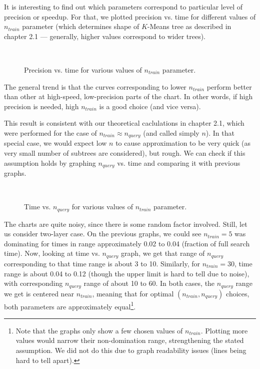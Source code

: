 It is interesting to find out which parameters correspond to particular level
of precision or speedup. For that, we plotted precision vs. time for different
values of $n_{train}$ parameter (which determines shape of $K$-Means tree as
described in chapter 2.1 --- generally, higher values correspond to wider
trees).


\begin{figure}[H]
	\centering
	\\
	\caption{Precision vs. time for various values of $n_{train}$ parameter.}
\end{figure}

The general trend is that the curves corresponding to lower $n_{train}$ perform
better than other at high-speed, low-precision parts of the chart. In other
words, if high precision is needed, high $n_{train}$ is a good choice (and vice
versa).

This result is consistent with our theoretical caclulations in chapter 2.1, which
were performed for the case of $n_{train} \approx n_{query}$ (and called simply $n$).
In that special case, we would expect low $n$ to cause approximation to be very
quick (as very small number of subtrees are considered), but rough. We can
check if this assumption holds by graphing $n_{query}$ vs. time and comparing
it with previous graphs.

\begin{figure}[H]
	\centering
	\\
	\caption{Time vs. $n_{query}$ for various values of $n_{train}$ parameter.}
\end{figure}

The charts are quite noisy, since there is some random factor involved. Still,
let us consider two-layer case. On the previous graphs, we could see 
$n_{train} = 5$ was dominating for times in range approximately 0.02 to 
0.04 (fraction of full search time). Now, looking at time vs. $n_{query}$ graph,
we get that range of $n_{query}$ corresponding to that time range is about
3 to 10. Similarly, for $n_{train} = 30$, time range is about 0.04 to 0.12
(though the upper limit is hard to tell due to noise), with corresponding
$n_{query}$ range of about 10 to 60. In both cases, the $n_{query}$ range we
get is centered near $n_{train}$, meaning that for optimal 
$(n_{train}, n_{query})$ choices, both parameters are approximately 
equal\footnote{
Note that the graphs only show a few chosen values of $n_{train}$. Plotting
more values would narrow their non-domination range, strengthening the 
stated assumption. We did not do this due to graph readability issues
(lines being hard to tell apart).
}.


\newpage
